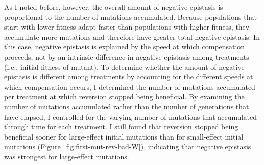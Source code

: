 \begin{doublespace}
As I noted before, however, the overall amount of negative epistasis
is proportional to the number of mutations accumulated.
%
Because populations that start with lower fitness adapt faster
than populations with higher fitness, they accumulate more mutations
and therefore have greater total negative epistasis.
%
In this case, negative epistasis is explained by the speed
at which compensation proceeds,
not by an intrinsic difference in negative epistasis
among treatments (i.e., initial fitness of mutant).
%
To determine whether the amount of negative epistasis
is different among treatments by accounting for the different
speeds at which compensation occurs,
I determined the number of mutations accumulated per treatment
at which reversion stopped being beneficial.
%
By examining the number of mutations accumulated
rather than the number of generations that have elapsed,
I controlled for the varying number of mutations
that accumulated through time for each treatment.
%
I still found that reversion stopped being beneficial sooner
for large-effect initial mutations than for small-effect initial mutations
(Figure~\ref{fig:first-mut-rev-bad-W}),
indicating that negative epistasis was strongest for large-effect mutations.




\end{doublespace}
